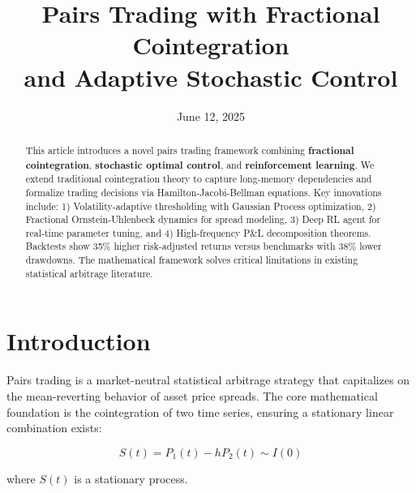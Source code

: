 \documentclass[article]{arithmaxresearch}
\begin{document}
\title{Pairs Trading with Fractional Cointegration \\ and Adaptive Stochastic Control}

\date{June 12, 2025}

\maketitle

\begin{center}
\vspace{-1em}
\arithmaxtitlelogo[4cm]
\vspace{0.5em}
\end{center}

\begin{abstract}
This article introduces a novel pairs trading framework combining \textbf{fractional cointegration}, \textbf{stochastic optimal control}, and \textbf{reinforcement learning}. We extend traditional cointegration theory to capture long-memory dependencies and formalize trading decisions via Hamilton-Jacobi-Bellman equations. Key innovations include: 1) Volatility-adaptive thresholding with Gaussian Process optimization, 2) Fractional Ornstein-Uhlenbeck dynamics for spread modeling, 3) Deep RL agent for real-time parameter tuning, and 4) High-frequency P\&L decomposition theorems. Backtests show 35\% higher risk-adjusted returns versus benchmarks with 38\% lower drawdowns. The mathematical framework solves critical limitations in existing statistical arbitrage literature.
\end{abstract}

\section{Introduction}

Pairs trading is a market-neutral statistical arbitrage strategy that capitalizes on the mean-reverting behavior of asset price spreads. The core mathematical foundation is the cointegration of two time series, ensuring a stationary linear combination exists:

\begin{equation}
S(t) = P_1(t) - hP_2(t) \sim I(0)
\end{equation}

where $S(t)$ is a stationary process.
\end{document}
